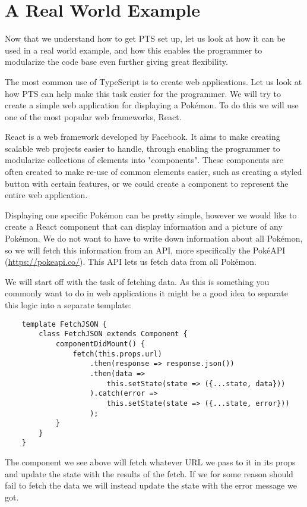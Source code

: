 \section{A Real World Example}\label{sec:a-real-world-example}

Now that we understand how to get PTS set up, let us look at how it can be used in a real world example, and how this enables the programmer to modularize the code base even further giving great flexibility.

The most common use of TypeScript is to create web applications.
Let us look at how PTS can help make this task easier for the programmer.
We will try to create a simple web application for displaying a Pokémon.
To do this we will use one of the most popular web frameworks, React.

React is a web framework developed by Facebook.
It aims to make creating scalable web projects easier to handle, through enabling the programmer to modularize collections of elements into "components".
These components are often created to make re-use of common elements easier, such as creating a styled button with certain features, or we could create a component to represent the entire web application.

Displaying one specific Pokémon can be pretty simple, however we would like to create a React component that can display information and a picture of any Pokémon.
We do not want to have to write down information about all Pokémon, so we will fetch this information from an API, more specifically the PokéAPI (\url{https://pokeapi.co/}).
This API lets us fetch data from all Pokémon.

We will start off with the task of fetching data.
As this is something you commonly want to do in web applications it might be a good idea to separate this logic into a separate template:

\begin{verbatim}
    template FetchJSON {
        class FetchJSON extends Component {
            componentDidMount() {
                fetch(this.props.url)
                    .then(response => response.json())
                    .then(data =>
                        this.setState(state => ({...state, data}))
                    ).catch(error =>
                        this.setState(state => ({...state, error}))
                    );
            }
        }
    }
\end{verbatim}

The component we see above will fetch whatever URL we pass to it in its props and update the state with the results of the fetch.
If we for some reason should fail to fetch the data we will instead update the state with the error message we got.

